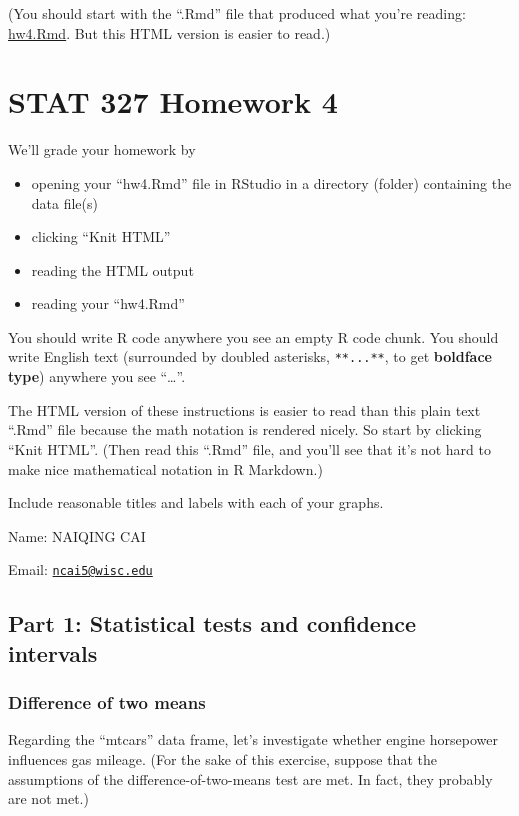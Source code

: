 \documentclass[]{article}
\title{}
\author{}
\date{}
\providecommand{\tightlist}{%
  \setlength{\itemsep}{0pt}\setlength{\parskip}{0pt}}
\begin{document}
(You should start with the ``.Rmd'' file that produced what you're
reading: \url{hw4.Rmd}. But this HTML version is easier to read.)

\section{STAT 327 Homework 4}\label{stat-327-homework-4}

We'll grade your homework by

\begin{itemize}
\tightlist
\item
  opening your ``hw4.Rmd'' file in RStudio in a directory (folder)
  containing the data file(s)
\item
  clicking ``Knit HTML''
\item
  reading the HTML output
\item
  reading your ``hw4.Rmd''
\end{itemize}

You should write R code anywhere you see an empty R code chunk. You
should write English text (surrounded by doubled asterisks,
\texttt{**...**}, to get \textbf{boldface type}) anywhere you see
``\ldots{}''.

The HTML version of these instructions is easier to read than this plain
text ``.Rmd'' file because the math notation is rendered nicely. So
start by clicking ``Knit HTML''. (Then read this ``.Rmd'' file, and
you'll see that it's not hard to make nice mathematical notation in R
Markdown.)

Include reasonable titles and labels with each of your graphs.

Name: NAIQING CAI

Email: \href{mailto:ncai5@wisc.edu}{\nolinkurl{ncai5@wisc.edu}}

\subsection{Part 1: Statistical tests and confidence
intervals}\label{part-1-statistical-tests-and-confidence-intervals}

\subsubsection{Difference of two means}\label{difference-of-two-means}

Regarding the ``mtcars'' data frame, let's investigate whether engine
horsepower influences gas mileage. (For the sake of this exercise,
suppose that the assumptions of the difference-of-two-means test are
met. In fact, they probably are not met.)
\end{document}
